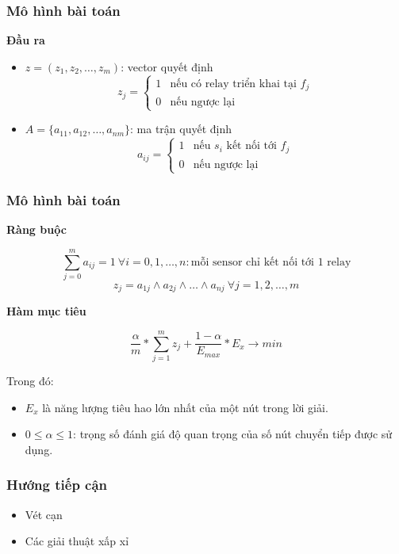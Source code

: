 \begin{frame}
    \frametitle{Mô hình bài toán}
\textbf{Đầu ra }
\begin{itemize}
    \item $z = (z_1, z_2,…, z_m)$: vector quyết định
    \begin{equation}
        z_j = \begin{cases}
            1 & \textrm{nếu có relay triển khai tại $f_j$}\\
            0 & \textrm{nếu ngược lại}
        \end{cases}
    \end{equation}
    \item $A = \{a_{11}, a_{12},…, a_{nm}\}$: ma trận quyết định
    \begin{equation}
        a_{ij} = \begin{cases}
            1 & \textrm{nếu $s_i$ kết nối tới $f_j$}\\
            0 & \textrm{nếu ngược lại}
        \end{cases}
    \end{equation}
\end{itemize}

\end{frame}

\begin{frame}
    \frametitle{Mô hình bài toán}
\textbf{Ràng buộc }

\begin{equation}
    \sum_{j = 0}^m a_{ij} = 1 ~\forall i = 0, 1, \ldots, n: \textrm{mỗi sensor chỉ kết nối tới 1 relay}
\end{equation}
\begin{equation}
    z_j = a_{1j} \wedge a_{2j} \wedge \ldots \wedge a_{nj} ~\forall j = 1, 2, \ldots, m
\end{equation}

\textbf{Hàm mục tiêu }

\begin{equation}
    \frac{\alpha}{m} * \sum_{j = 1}^m z_j + \frac{1 - \alpha}{E_{max}} * E_x \rightarrow min
    \label{obj_func}
\end{equation}

Trong đó:
\begin{itemize}
    \item $E_x$ là năng lượng tiêu  hao lớn nhất của một nút trong lời giải. 
    \item $0 \leq \alpha \leq 1$: trọng số đánh giá độ quan trọng của số nút chuyển tiếp được sử dụng.
\end{itemize}
    
\end{frame}

\begin{frame}
    \frametitle{Hướng tiếp cận}
    \begin{itemize}
        \item Vét cạn 
        \item Các giải thuật xấp xỉ
    \end{itemize}
\end{frame}